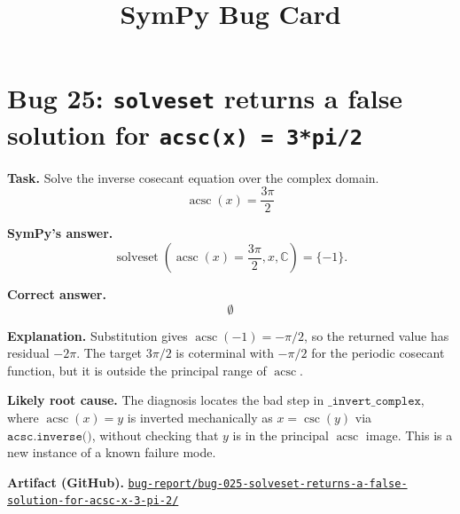 \documentclass[11pt]{article}
\title{SymPy Bug Card}
\date{}
\newcommand{\artifactrepo}{https://github.com/TODO-org/TODO-repo}
\newcommand{\bugbundle}[1]{\href{\artifactrepo/tree/main/bug-report/#1}{\nolinkurl{bug-report/#1/}}}
\begin{document}
\author{}
\maketitle

\section*{Bug 25: \texttt{solveset} returns a false solution for \texttt{acsc(x) = 3*pi/2}}

\begin{counterexamplebox}
\textbf{Task.} Solve the inverse cosecant equation over the complex domain.
\[
\operatorname{acsc}(x)=\frac{3\pi}{2}
\]

\medskip
\textbf{SymPy's answer.}
\[
\operatorname{solveset}\!\left(\operatorname{acsc}(x)=\frac{3\pi}{2},x,\mathbb{C}\right)=\{-1\}.
\]

\medskip
\textbf{Correct answer.}
\[
\emptyset
\]

\medskip
\textbf{Explanation.} Substitution gives \(\operatorname{acsc}(-1)=-\pi/2\), so the returned value has residual \(-2\pi\). The target \(3\pi/2\) is coterminal with \(-\pi/2\) for the periodic cosecant function, but it is outside the principal range of \(\operatorname{acsc}\).

\medskip
\textbf{Likely root cause.} The diagnosis locates the bad step in \(\texttt{\_invert\_complex}\), where \(\operatorname{acsc}(x)=y\) is inverted mechanically as \(x=\csc(y)\) via \(\texttt{acsc.inverse()}\), without checking that \(y\) is in the principal \(\operatorname{acsc}\) image. This is a new instance of a known failure mode.

\medskip
\textbf{Artifact (GitHub).} \bugbundle{bug-025-solveset-returns-a-false-solution-for-acsc-x-3-pi-2}
\end{counterexamplebox}
\end{document}
